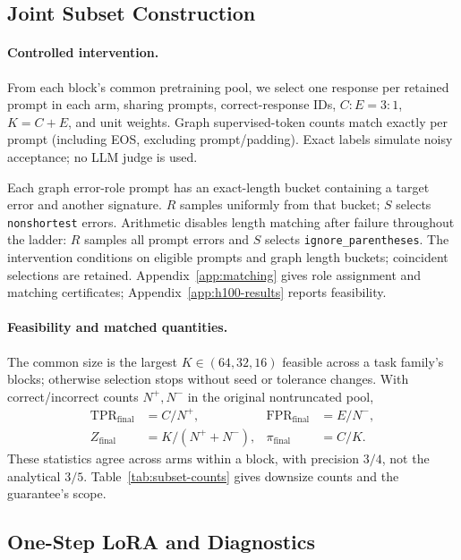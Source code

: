 \subsection{Joint Subset Construction}
\label{sec:matching}

\paragraph{Controlled intervention.}
From each block's common pretraining pool, we select one response per retained
prompt in each arm, sharing prompts, correct-response IDs, $C:E=3:1$,
$K=C+E$, and unit weights. Graph supervised-token counts match exactly per
prompt (including EOS, excluding prompt/padding). Exact labels simulate noisy
acceptance; no LLM judge is used.

Each graph error-role prompt has an exact-length bucket containing a target
error and another signature. $R$ samples uniformly from that bucket; $S$
selects \texttt{nonshortest} errors. Arithmetic disables length matching
after failure throughout the ladder: $R$ samples all prompt errors and $S$
selects \texttt{ignore\_parentheses}. The intervention conditions on eligible
prompts and graph length buckets; coincident selections are retained.
Appendix~\ref{app:matching} gives role assignment and matching certificates;
Appendix~\ref{app:h100-results} reports feasibility.

\paragraph{Feasibility and matched quantities.}
The common size is the largest $K\in(64,32,16)$ feasible across a task
family's blocks; otherwise selection stops without seed or tolerance changes.
With correct/incorrect counts $N^+,N^-$ in the original nontruncated pool,
\begin{equation}
 \begin{aligned}
 \mathrm{TPR}_{\mathrm{final}}&=C/N^+,&
 \mathrm{FPR}_{\mathrm{final}}&=E/N^-,\\
 Z_{\mathrm{final}}&=K/(N^++N^-),&
 \pi_{\mathrm{final}}&=C/K.
 \end{aligned}
 \label{eq:finite-rates}
\end{equation}
These statistics agree across arms within a block, with precision $3/4$,
not the analytical $3/5$. Table~\ref{tab:subset-counts} gives downsize
counts and the guarantee's scope.

\subsection{One-Step LoRA and Diagnostics}
\label{sec:lora}

